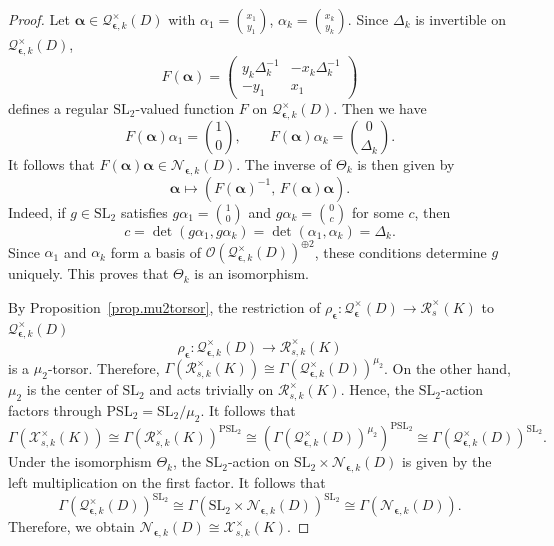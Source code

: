 \documentclass[10pt,a4paper]{amsart}
\newcommand{\PSL}{\mathrm{PSL}}
\newcommand{\SL}{\mathrm{SL}}
\newcommand{\calN}{\mathcal{N}}
\newcommand{\calQ}{\mathcal{Q}}
\newcommand{\calR}{\mathcal{R}}
\newcommand{\calX}{\mathcal{X}}
\begin{document}
	\begin{proof}
		Let	$\boldsymbol{\alpha}\in \calQ^\times_{{\boldsymbol{\epsilon}},k}(D)$ with $
		\alpha_{1}	= \binom{x_1}{y_1}$, $\alpha_{k} =\binom{x_{k}}{y_{k}}$.
		Since $\Delta_k$ is invertible on $\calQ^\times_{{\boldsymbol{\epsilon}},k}(D)$,
		$$
		F(\boldsymbol{\alpha}) 	=
		\begin{pmatrix}
			y_{k}\Delta_k^{-1}	& 	-x_{k}\Delta_k^{-1} \\
			-y_{1}		& 		x_{1}
		\end{pmatrix}
		$$
		defines a regular $\SL_2$-valued function $F$ on $\calQ^\times_{{\boldsymbol{\epsilon}},k}(D)$.
		Then we have
		$$
		F(\boldsymbol{\alpha})\alpha_{1} = \binom{1}{0},	\qquad
		F(\boldsymbol{\alpha})\alpha_{k} = \binom{0}{\Delta_k}.
		$$
		It follows that	$F(\boldsymbol{\alpha})\boldsymbol{\alpha} \in	\calN_{\boldsymbol{\epsilon},k}(D)$. The inverse of $\Theta_k$ is then  given by
		$$
		\boldsymbol{\alpha}	\longmapsto	(F(\boldsymbol{\alpha})^{-1}, \, F(\boldsymbol{\alpha})\boldsymbol{\alpha}).
		$$
		Indeed, if $g\in\SL_2$ satisfies $g\alpha_{1} = \binom{1}{0}$ and $g\alpha_{k} = \binom{0}{c}$ for some $c$,
		then 
		$$
		c =	\det \left(g\alpha_{1},	g\alpha_{k}	\right) = \det \left(\alpha_{1}, \alpha_{k} \right) = \Delta_k.
		$$
		Since $\alpha_1$ and $\alpha_k$ form a basis of
		$\mathcal O({\calQ^\times_{{\boldsymbol{\epsilon}},k}(D)})^{\oplus2 }$,  these conditions determine $g$ uniquely. This proves that $\Theta_k$ is an isomorphism.

		By Proposition~\ref{prop.mu2torsor}, the restriction of $\rho_{\boldsymbol{\epsilon}}: \calQ^\times_{\boldsymbol{\epsilon}}(D) \rightarrow \calR^\times_{s}(K)$ to $\calQ^\times_{{\boldsymbol{\epsilon}},k}(D)$
		$$
		\rho_{\boldsymbol{\epsilon}}: 	\calQ^\times_{{\boldsymbol{\epsilon}},k}(D)\longrightarrow	\calR^\times_{s,k}(K)
		$$
		is a $\mu_2$-torsor. Therefore,
		$\Gamma (\calR^\times_{s,k}(K)) \cong \Gamma (\calQ^\times_{{\boldsymbol{\epsilon}},k}(D))^{\mu_2}$.
		On the other hand,  $\mu_2$ is the center of $\SL_2$ and acts trivially on
		$\calR^\times_{s,k}(K)$. Hence, the $\SL_2$-action factors through
		$\PSL_2=\SL_2/\mu_2$. It follows that
		\[
		\Gamma (\calX_{s,k}^\times(K)) \cong
		\Gamma (\calR^\times_{s,k}(K))^{\PSL_2}	\cong 
        (\Gamma (\calQ^\times_{{\boldsymbol{\epsilon}},k}(D))^{\mu_2})^{\PSL_2} \cong 
        \Gamma (\calQ^\times_{{\boldsymbol{\epsilon}},k}(D))^{\SL_2}.
		\]
		Under the isomorphism $\Theta_k$, the $\SL_2$-action on $\SL_2 \times\calN_{\boldsymbol{\epsilon},k}(D)$ is given by the left multiplication on the first factor. It follows that
		$$
		\Gamma (\calQ^\times_{{\boldsymbol{\epsilon}},k}(D))^{\SL_2} \cong
        \Gamma(\SL_2 \times\calN_{\boldsymbol{\epsilon},k}(D))^{\SL_2} \cong
		\Gamma (\calN_{\boldsymbol{\epsilon},k}(D)).
		$$
		Therefore, we obtain $\calN_{\boldsymbol{\epsilon},k}(D) \cong \calX_{s,k}^\times(K)$.
	\end{proof}
\end{document}
